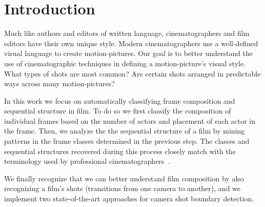 \section*{Introduction}

Much like authors and editors of written language, cinematographers and film editors have their own unique style.
Modern cinematographers use a well-defined visual language to create motion-pictures. Our goal is to better understand the use of cinematographic techniques in defining a motion-picture's visual style. What types of shots are most common? Are certain shots arranged in predictable ways across many motion-pictures?

In this work we focus on automatically classifying frame composition and sequential structure in film.  To do so we first classify the composition of individual frames based on the number of actors and placement of each actor in the frame.  Then, we analyze the the sequential structure of a film by mining patterns in the frame classes determined in the previous step.  The classes and sequential structures recovered during this process closely match with the terminology used by professional cinematographers~\cite{arijon_grammar_1991}.  

We finally recognize that we can better understand film composition by also recognizing a film's shots (transitions from one camera to another), and we implement two state-of-the-art approaches for camera shot boundary detection.

